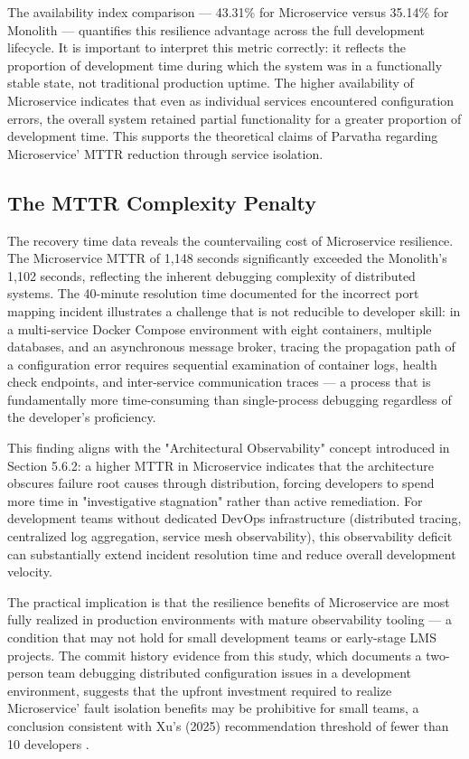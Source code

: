 The availability index comparison — 43.31\% for Microservice versus 35.14\% for Monolith — quantifies this resilience advantage across the full development lifecycle. It is important to interpret this metric correctly: it reflects the proportion of development time during which the system was in a functionally stable state, not traditional production uptime. The higher availability of Microservice indicates that even as individual services encountered configuration errors, the overall system retained partial functionality for a greater proportion of development time. This supports the theoretical claims of Parvatha \cite{bauer2012cloud} regarding Microservice' MTTR reduction through service isolation.

\subsection{The MTTR Complexity Penalty}

The recovery time data reveals the countervailing cost of Microservice resilience. The Microservice MTTR of 1,148 seconds significantly exceeded the Monolith's 1,102 seconds, reflecting the inherent debugging complexity of distributed systems. The 40-minute resolution time documented for the incorrect port mapping incident illustrates a challenge that is not reducible to developer skill: in a multi-service Docker Compose environment with eight containers, multiple databases, and an asynchronous message broker, tracing the propagation path of a configuration error requires sequential examination of container logs, health check endpoints, and inter-service communication traces — a process that is fundamentally more time-consuming than single-process debugging regardless of the developer's proficiency.

This finding aligns with the "Architectural Observability" concept introduced in Section 5.6.2: a higher MTTR in Microservice indicates that the architecture obscures failure root causes through distribution, forcing developers to spend more time in "investigative stagnation" rather than active remediation. For development teams without dedicated DevOps infrastructure (distributed tracing, centralized log aggregation, service mesh observability), this observability deficit can substantially extend incident resolution time and reduce overall development velocity.

The practical implication is that the resilience benefits of Microservice are most fully realized in production environments with mature observability tooling — a condition that may not hold for small development teams or early-stage LMS projects. The commit history evidence from this study, which documents a two-person team debugging distributed configuration issues in a development environment, suggests that the upfront investment required to realize Microservice' fault isolation benefits may be prohibitive for small teams, a conclusion consistent with Xu's (2025) recommendation threshold of fewer than 10 developers \cite{Alex_xu_2025}.


